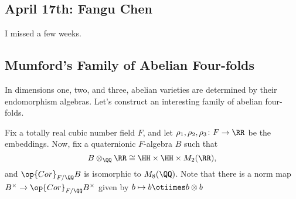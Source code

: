 \documentclass{article}
\begin{document}
\subsection{April 17th: Fangu Chen}
I missed a few weeks.

\subsection{Mumford's Family of Abelian Four-folds}
In dimensions one, two, and three, abelian varieties are determined by their endomorphism algebras. Let's construct an interesting family of abelian four-folds.

Fix a totally real cubic number field $F$, and let $\rho_1,\rho_2,\rho_3\colon F\to\RR$ be the embeddings. Now, fix a quaternionic $F$-algebra $B$ such that
\[B\otimes_\QQ\RR\cong\HH\times\HH\times M_2(\RR),\]
and $\op{Cor}_{F/\QQ}B$ is isomorphic to $M_8(\QQ)$. Note that there is a norm map $B^\times\to\op{Cor}_{F/\QQ}B^\times$ given by $b\mapsto b\otiimes b\otimes b$
\end{document}
